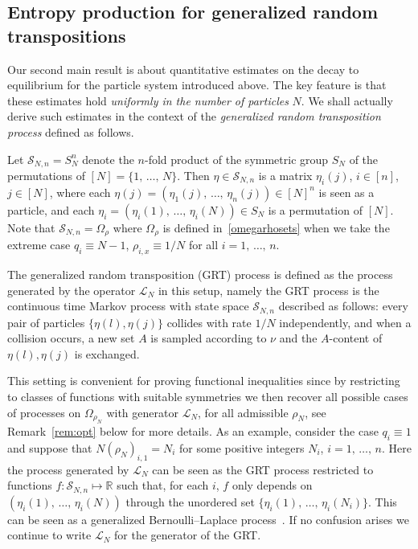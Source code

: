 \documentclass[AHL,Unicode,longabstracts,published]{cedram}
\newcommand{\cL}{\mathcal{L}}
\newcommand{\cS}{\mathcal{S}}
\newcommand{\bbR}{\mathbb{R}}
\let\r=\rho
\let\O=\Omega
\begin{document}
\subsection{Entropy production for generalized random transpositions}

Our second main result is about quantitative estimates on the decay to equilibrium for the particle system introduced above. The key feature is that these estimates hold \emph{uniformly in the number of particles} $N$. We shall actually derive such estimates in the context of the \emph{generalized random transposition process} defined as follows.

Let $\cS_{N,n}=S_N^n$ denote the $n$-fold product of the symmetric group $S_N$ of the permutations of $[N]=\{1,\,\dots,\,N\}$. Then $\eta\in \cS_{N,n}$ is a matrix $\eta_i(j)$, $i\in[n]$, $j\in[N]$, where each $\eta(j)=(\eta_1(j),\,\dots,\,\eta_n(j))\in[N]^n$ is seen as a particle, and each $\eta_i=(\eta_i(1),\,\dots,\,\eta_i(N))\in S_N$ is a permutation of $[N]$. Note that $\cS_{N,n} = \O_{\r}$ where $\O_{\r}$ is defined in~\eqref{omegarhosets} when we take the extreme case $q_i\equiv N-1$, $\r_{i,x}\equiv 1/N$ for all $i=1,\,\dots,\,n$.

The generalized random transposition (GRT) process is defined as the process generated by the operator $\cL_N$ in this setup, namely the GRT process is the continuous time Markov process with state space $\cS_{N,n}$ described as follows: every pair of particles $\{\eta(l),\eta(j)\}$ collides with rate $1/N$ independently, and when a collision occurs, a new set $A$ is sampled according to $\nu$ and the $A$-content of $\eta(l),\eta(j)$ is exchanged.

This setting is convenient for proving functional inequalities since by restricting to classes of functions with suitable symmetries we then recover all possible cases of processes on $\O_{\r_N}$ with generator $\cL_N$, for all admissible $\r_N$, see Remark~\ref{rem:opt} below for more details. As an example, consider the case $q_i\equiv 1$ and suppose that $N(\r_N)_{i,1} = N_i$ for some positive integers $N_i$, $i=1,\,\dots,\, n$. Here the process generated by $\cL_N$ can be seen as the GRT process restricted to functions $f:\cS_{N,n}\mapsto\bbR$ such that, for each $i$, $f$ only depends on $(\eta_i(1),\,\dots,\,\eta_i(N))$ through the unordered set $\{\eta_i(1),\,\dots,\,\eta_i(N_i)\}$. This can be seen as a generalized Bernoulli--Laplace process~\cite{DS}. If no confusion arises we continue to write $\cL_N$ for the generator of the GRT.
\end{document}
